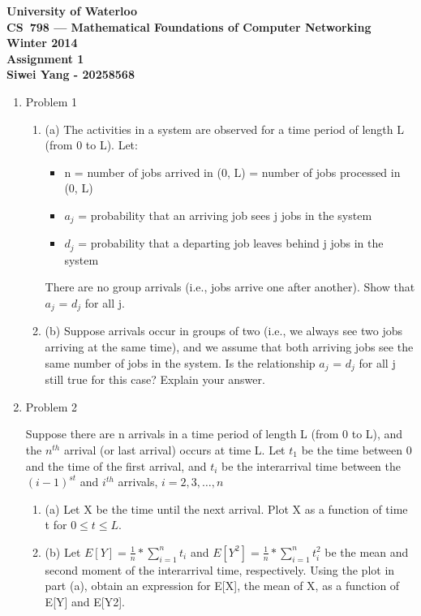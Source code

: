 \documentclass[12pt]{article}
\begin{document}
\begin{center}
\large\bf University of Waterloo\\
CS~798 --- Mathematical Foundations of Computer Networking\\
Winter 2014\\
Assignment 1\\
Siwei Yang - 20258568\\
\end{center}
\bigskip

\begin{enumerate}
\item{Problem 1}

\begin{enumerate}
\item{} (a) The activities in a system are observed for a time period of length L (from 0 to L).
Let:
\begin{itemize}
\item n = number of jobs arrived in (0, L) = number of jobs processed in (0, L) 
\item $a_j$ = probability that an arriving job sees j jobs in the system
\item $d_j$ = probability that a departing job leaves behind j jobs in the system
\end{itemize}

There are no group arrivals (i.e., jobs arrive one after another). Show that $a_j$ = $d_j$ for all j.

\item{} (b) Suppose arrivals occur in groups of two (i.e., we always see two jobs arriving at the same time), and we assume that both arriving jobs see the same number of jobs in the system. Is the relationship $a_j$ = $d_j$ for all j still true for this case? Explain your answer.
\end{enumerate}

\medskip

\item{Problem 2}

Suppose there are n arrivals in a time period of length L (from 0 to L), and the $n^{th}$ arrival (or last arrival) occurs at time L. Let $t_1$ be the time between 0 and the time of the first arrival, and $t_i$ be the interarrival time between the $(i-1)^{st}$ and $i^{th}$ arrivals, $i = 2, 3, \dotsc, n$
\begin{enumerate}
\item{} (a) Let X be the time until the next arrival. Plot X as a function of time t for $0 \le t \le L$.

\item{} (b) Let $E[Y] = \frac{1}{n} * \sum^{n}_{i=1}{t_i}$ and $E[Y^2] = \frac{1}{n} * \sum^{n}_{i=1}{t_i^2}$ be the mean and second moment of the interarrival time, respectively. Using the plot in part (a), obtain an expression for E[X], the mean of X, as a function of E[Y] and E[Y2].
\end{enumerate}

\end{enumerate}
\end{document}
